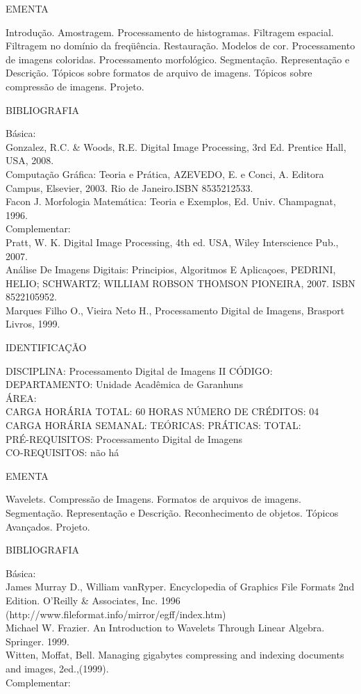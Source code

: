 \documentclass[
	12pt,				%
	openright,			%
  oneside,     %
	a4paper,			%
	english,			%
	french,				%
	spanish,			%
	brazil				%
	]{abntex2}
\begin{document}
\begin{apendicesenv}
EMENTA 

Introdução. Amostragem. Processamento de histogramas. Filtragem
espacial. Filtragem no domínio da freqüência. Restauração. Modelos de
cor. Processamento de imagens coloridas. Processamento morfológico.
Segmentação. Representação e Descrição. Tópicos sobre formatos de
arquivo de imagens. Tópicos sobre compressão de imagens. Projeto.

BIBLIOGRAFIA 

Básica:\\
Gonzalez, R.C. \& Woods, R.E. Digital Image Processing, 3rd Ed.
Prentice Hall, USA, 2008.\\
Computação Gráfica: Teoria e Prática, AZEVEDO, E. e Conci, A. Editora
Campus, Elsevier, 2003. Rio de Janeiro.ISBN 8535212533.\\
Facon J. Morfologia Matemática: Teoria e
Exemplos, Ed. Univ. Champagnat, 1996.\\
Complementar:\\
Pratt, W. K.  Digital Image Processing, 4th ed. USA, Wiley
Interscience Pub., 2007.\\
Análise De Imagens Digitais: Principios, Algoritmos E Aplicaçoes,
PEDRINI, HELIO; SCHWARTZ; WILLIAM ROBSON THOMSON PIONEIRA, 2007. ISBN
8522105952.\\
Marques Filho O., Vieira Neto H., Processamento Digital
de Imagens, Brasport Livros, 1999.

\newpage IDENTIFICAÇÃO

DISCIPLINA: Processamento Digital de Imagens II CÓDIGO:\\ 
DEPARTAMENTO: Unidade Acadêmica de Garanhuns\\
ÁREA: \\
CARGA HORÁRIA TOTAL: 60 HORAS NÚMERO DE CRÉDITOS: 04\\
CARGA HORÁRIA SEMANAL: TEÓRICAS: PRÁTICAS: TOTAL: \\
PRÉ-REQUISITOS: Processamento Digital de Imagens\\
CO-REQUISITOS: não há

EMENTA 

Wavelets. Compressão de Imagens. Formatos de arquivos de imagens.
Segmentação. Representação e Descrição. Reconhecimento de objetos.
Tópicos Avançados. Projeto.

BIBLIOGRAFIA 

Básica:\\
James Murray D., William vanRyper. Encyclopedia of Graphics File Formats
2nd Edition. O'Reilly \& Associates, Inc. 1996
(http://www.fileformat.info/mirror/egff/index.htm)\\
Michael W. Frazier. An Introduction to Wavelets Through Linear Algebra.
Springer. 1999.\\
Witten, Moffat, Bell. Managing gigabytes compressing and indexing
documents and images, 2ed.,(1999).\\
Complementar:\\


\end{apendicesenv}
\end{document}

